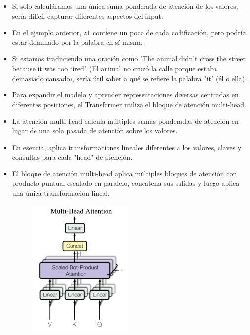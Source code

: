 \begin{itemize}
\item Si solo calculáramos una única suma ponderada de atención de los valores, sería difícil capturar diferentes aspectos del input.

\item En el ejemplo anterior, $z1$ contiene un poco de cada codificación, pero podría estar dominado por la palabra en sí misma.

\item Si estamos traduciendo una oración como "The animal didn't cross the street because it was too tired" (El animal no cruzó la calle porque estaba demasiado cansado), sería útil saber a qué se refiere la palabra "it" (él o ella).

\item Para expandir el modelo y aprender representaciones diversas centradas en diferentes posiciones, el Transformer utiliza el bloque de atención multi-head.

\item La atención multi-head calcula múltiples sumas ponderadas de atención en lugar de una sola pasada de atención sobre los valores.

\item En esencia, aplica transformaciones lineales diferentes a los valores, claves y consultas para cada "head" de atención.

\item El bloque de atención multi-head aplica múltiples bloques de atención con producto puntual escalado en paralelo, concatena sus salidas y luego aplica una única transformación lineal.

\begin{figure}[h]
  \centering
  \includegraphics[scale=0.48]{pics/multi_head_attention.png}
\end{figure}


\end{itemize}
